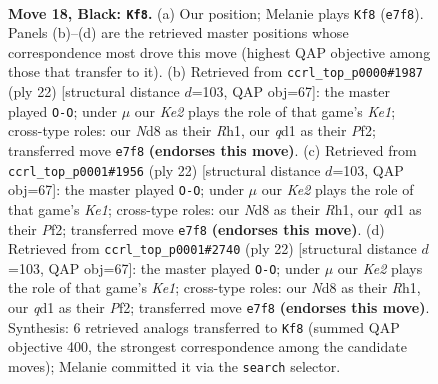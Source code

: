 \documentclass[11pt]{article}
\begin{document}
\clearpage

\begin{figure}[p]\centering
\begin{subfigure}{0.46\textwidth}\centering
\resizebox{\linewidth}{!}{%
\newchessgame
\chessboard[
  setfen={r1bnr3/1pppkppp/p2q4/B2P4/4n3/4PNP1/PP3PBP/1R1Q1RK1 b - - 12 18},
  showmover=false,
  pgfstyle=straightmove, color=movearrow, markmove={e7-f8}
]}
\caption{}
\end{subfigure}\hfill
\begin{subfigure}{0.46\textwidth}\centering
\resizebox{\linewidth}{!}{%
\newchessgame
\chessboard[
  setfen={rn1q1rk1/pb3p1p/1pp2bp1/3p4/Q2P4/P1N2NP1/1P2PPBP/R3K2R w KQ - 0 12},
  showmover=false,
  pgfstyle=straightmove, color=movearrow, markmove={e1-g1}
]}
\caption{}
\end{subfigure}
\\[4pt]
\begin{subfigure}{0.46\textwidth}\centering
\resizebox{\linewidth}{!}{%
\newchessgame
\chessboard[
  setfen={rn1q1rk1/pb3p1p/1pp2bp1/3p4/Q2P4/P1N2NP1/1P2PPBP/R3K2R w KQ - 2 12},
  showmover=false,
  pgfstyle=straightmove, color=movearrow, markmove={e1-g1}
]}
\caption{}
\end{subfigure}\hfill
\begin{subfigure}{0.46\textwidth}\centering
\resizebox{\linewidth}{!}{%
\newchessgame
\chessboard[
  setfen={rn1q1rk1/pb3p1p/1pp2bp1/3p4/Q2P4/P1N2NP1/1P2PPBP/R3K2R w KQ - 0 12},
  showmover=false,
  pgfstyle=straightmove, color=movearrow, markmove={e1-g1}
]}
\caption{}
\end{subfigure}
\caption{\textbf{Move 18, Black: \texttt{Kf8}.} (a) Our position; Melanie plays \texttt{Kf8} (\texttt{e7f8}). Panels (b)--(d) are the retrieved master positions whose correspondence most drove this move (highest QAP objective among those that transfer to it). (b) Retrieved from \texttt{ccrl\_top\_p0000\#1987} (ply 22) [structural distance $d$=103, QAP obj=67]: the master played \texttt{O-O}; under $\mu$ our \emph{Ke2} plays the role of that game's \emph{Ke1}; cross-type roles: our \emph{N}d8 as their \emph{R}h1, our \emph{q}d1 as their \emph{P}f2; transferred move \texttt{e7f8} \textbf{(endorses this move)}. (c) Retrieved from \texttt{ccrl\_top\_p0001\#1956} (ply 22) [structural distance $d$=103, QAP obj=67]: the master played \texttt{O-O}; under $\mu$ our \emph{Ke2} plays the role of that game's \emph{Ke1}; cross-type roles: our \emph{N}d8 as their \emph{R}h1, our \emph{q}d1 as their \emph{P}f2; transferred move \texttt{e7f8} \textbf{(endorses this move)}. (d) Retrieved from \texttt{ccrl\_top\_p0001\#2740} (ply 22) [structural distance $d$=103, QAP obj=67]: the master played \texttt{O-O}; under $\mu$ our \emph{Ke2} plays the role of that game's \emph{Ke1}; cross-type roles: our \emph{N}d8 as their \emph{R}h1, our \emph{q}d1 as their \emph{P}f2; transferred move \texttt{e7f8} \textbf{(endorses this move)}. Synthesis: 6 retrieved analogs transferred to \texttt{Kf8} (summed QAP objective 400, the strongest correspondence among the candidate moves); Melanie committed it via the \texttt{search} selector.}
\label{fig:thought-m35}
\end{figure}
\end{document}
